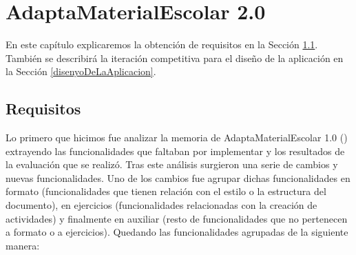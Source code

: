 \chapter{AdaptaMaterialEscolar 2.0}
\label{cap:AdaptaMaterialEscolar2.0}
En este capítulo explicaremos la obtención de requisitos en la Sección \ref{cap:requisitos}. También se describirá la iteración competitiva para el diseño de la aplicación en la Sección \ref{disenyoDeLaAplicacion}.

\section{Requisitos}
\label{cap:requisitos}

Lo primero que hicimos fue analizar la memoria de AdaptaMaterialEscolar 1.0 (\cite*{AdaptaMaterialEscolar1.0}) extrayendo las funcionalidades que faltaban por implementar y los resultados de la evaluación que se realizó. Tras este análisis surgieron una serie de cambios y nuevas funcionalidades. Uno de los cambios fue agrupar dichas funcionalidades en formato (funcionalidades que tienen relación con el estilo o la estructura del documento), en ejercicios (funcionalidades relacionadas con la creación de actividades) y finalmente en auxiliar (resto de funcionalidades que no pertenecen a formato o a ejercicios). Quedando las funcionalidades agrupadas de la siguiente manera:
\\

